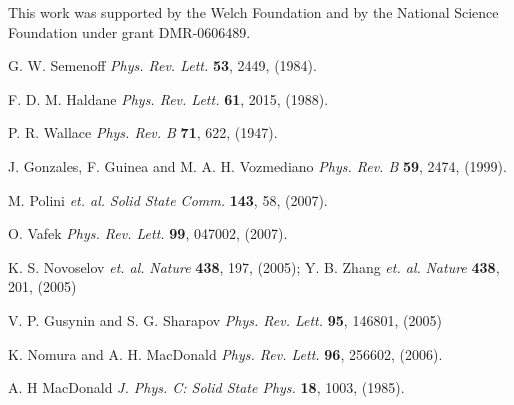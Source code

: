 \documentclass{ws-ijmpb}
\begin{document}
This work was supported by the Welch Foundation and by the National 
Science Foundation under grant DMR-0606489. 

\begin{thebibliography}{0}

G. W. Semenoff {\it Phys. Rev. Lett.} {\bf 53}, 2449, (1984).

F. D. M. Haldane {\it Phys. Rev. Lett.} {\bf 61}, 2015, (1988).

P. R. Wallace {\it Phys. Rev. B} {\bf 71}, 622, (1947).

J. Gonzales, F. Guinea and M. A. H. Vozmediano {\it Phys. Rev. B} {\bf 59}, 2474, 
(1999). 

M. Polini {\it et. al.} {\it Solid State Comm.} {\bf 143}, 58, (2007).

O. Vafek {\it Phys. Rev. Lett.} {\bf 99}, 047002, (2007).

K. S. Novoselov {\it et. al.} {\it Nature} {\bf 438}, 197, (2005); Y. B. Zhang {\it 
et. al.} {\it Nature} {\bf 438}, 201, (2005)

V. P. Gusynin and S. G. Sharapov  {\it Phys. Rev. Lett.} {\bf 95}, 146801, (2005)

K. Nomura and A. H. MacDonald {\it Phys. Rev. Lett.} {\bf 96}, 256602, (2006).

A. H MacDonald {\it J. Phys. C: Solid State Phys.} {\bf 18}, 1003, (1985).

\end{thebibliography}       
\end{document}
